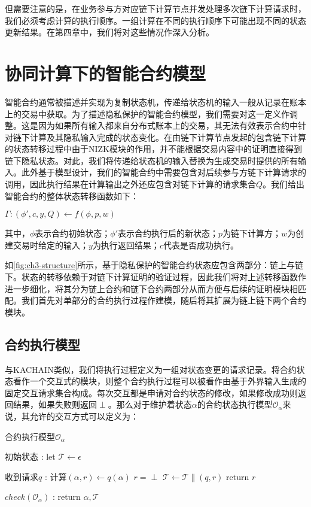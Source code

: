 但需要注意的是，在业务参与方对应链下计算节点并发处理多次链下计算请求时，我们必须考虑计算的执行顺序。一组计算在不同的执行顺序下可能出现不同的状态更新结果。在第四章中，我们将对这些情况作深入分析。
\section{协同计算下的智能合约模型}
智能合约通常被描述并实现为复制状态机，传递给状态机的输入一般从记录在账本上的交易中获取。为了描述隐私保护的智能合约模型，我们需要对这一定义作调整。这是因为如果所有输入都来自分布式账本上的交易，其无法有效表示合约中针对链下计算及其隐私输入完成的状态变化。在由链下计算节点发起的包含链下计算的状态转移过程中由于NIZK模块的作用，并不能根据交易内容中的证明直接得到链下隐私状态。对此，我们将传递给状态机的输入替换为生成交易时提供的所有输入。此外基于模型设计，我们的智能合约中需要包含对后续参与方链下计算请求的调用，因此执行结果在计算输出之外还应包含对链下计算的请求集合$Q$。我们给出智能合约的整体状态转移函数如下：
\begin{center}
    $\Gamma:(\phi', c, y, Q) \leftarrow f(\phi, p, w)$
\end{center}
其中，$\phi$表示合约初始状态；$\phi'$表示合约执行后的新状态；$p$为链下计算方；$w$为创建交易时给定的输入；$y$为执行返回结果；$c$代表是否成功执行。

如\autoref{fig:ch3-structure}所示，基于隐私保护的智能合约状态应包含两部分：链上与链下。状态的转移依赖于对链下计算证明的验证过程，因此我们将对上述转移函数作进一步细化，将其分为链上合约和链下合约两部分从而方便与后续的证明模块相匹配。我们首先对单部分的合约执行过程作建模，随后将其扩展为链上链下两个合约模块。

\subsection{合约执行模型}
与KACHAIN\cite{9505181}类似，我们将执行过程定义为一组对状态变更的请求记录。将合约状态看作一个交互式的模块，则整个合约执行过程可以被看作由基于外界输入生成的固定交互请求集合构成。每次交互都是申请对合约状态的修改，如果修改成功则返回结果，如果失败则返回$\perp$。那么对于维护着状态$\alpha$的合约状态执行模型$\mathcal{O}_\alpha$来说，其允许的交互方式可以定义为：
\begin{breakablealgorithm}
    \caption{合约执行模型$\mathcal{O}_{\alpha}$}
    \label{alg:ch3-1}
    \begin{algorithmic} 
    \item [初始状态]:
    \STATE let $\mathcal{T} \leftarrow \epsilon$
    \item [收到请求$q$]:
    \STATE 计算$(\alpha, r) \leftarrow q(\alpha)$
    \IF {$\alpha = \perp$}
    \STATE $r = \perp$
    \ENDIF
    \STATE $\mathcal{T} \leftarrow \mathcal{T} \parallel (q, r)$
    \STATE return $r$
    \item [$check(\mathcal{O}_{\alpha})$]:
    \STATE return $\alpha, \mathcal{T}$
    \end{algorithmic}
\end{breakablealgorithm}

